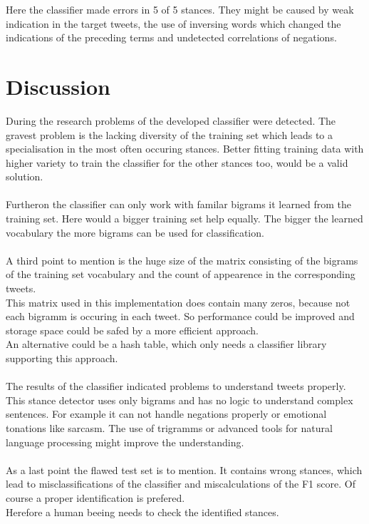 \documentclass[a4paper,12pt,twoside]{article}
\begin{document}
Here the classifier made errors in 5 of 5 stances. They might be caused by weak indication in the target tweets, the use of inversing words which changed the indications of the preceding terms and undetected correlations of negations.
 
\section{Discussion}
During the research problems of the developed classifier were detected.
The gravest problem is the lacking diversity of the training set which leads to a specialisation in the most often occuring stances. Better fitting training data with higher variety to train the classifier for the other stances too, would be a valid solution.\\ 
\\
Furtheron the classifier can only work with familar bigrams it learned from the training set. Here would a bigger training set help equally. The bigger the learned vocabulary the more bigrams can be used for classification. \\ 
\\
A third point to mention is the huge size of the matrix consisting of the bigrams of the training set vocabulary and the count of appearence in the corresponding tweets.\\
This matrix used in this implementation does contain many zeros, because not each bigramm is occuring in each tweet. So performance could be improved and storage space could be safed by a more efficient approach.\\
An alternative could be a hash table, which only needs a classifier library supporting this approach. \\
\\
The results of the classifier indicated problems to understand tweets properly.\\
This stance detector uses only bigrams and has no logic to understand complex sentences. For example it can not handle negations properly or emotional tonations like sarcasm. The use of trigramms or advanced tools for natural language processing might improve the understanding.\\
\\
As a last point the flawed test set is to mention. It contains wrong stances, which lead to misclassifications of the classifier and miscalculations of the F1 score. Of course a proper identification is prefered. \\
Herefore a human beeing needs to check the identified stances. 
\end{document}
